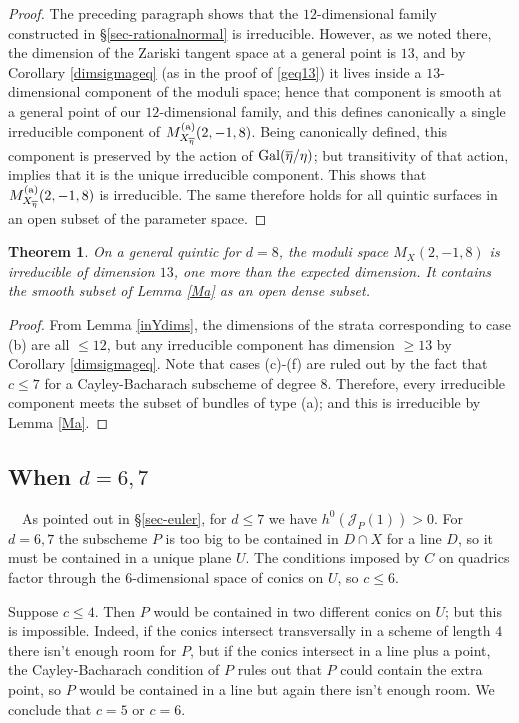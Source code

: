 \documentclass{amsart}
\theoremstyle{plain}
\newtheorem{theorem}{Theorem}[section]
\numberwithin{equation}{section}
\begin{document}
\begin{proof}
The preceding paragraph shows that the $12$-dimensional family constructed in \S \ref{sec-rationalnormal} is  irreducible. However,
as we noted there, the dimension of the Zariski tangent space at a general point 
is $13$, and by Corollary \ref{dimsigmageq} (as in the proof of \ref{geq13}) it lives inside a $13$-dimensional component of the moduli space;
hence that component is smooth at a general point of our $12$-dimensional family,
and this defines canonically a single irreducible component of  
$M^{{\rm (a)}}_{X_{\overline{\eta}}}(2,-1,8)$. Being canonically defined, this component is
preserved by the action of 
${\rm Gal} (\overline{\eta}/\eta )$; but transitivity of that action,
implies that it is the unique irreducible component. This shows that 
$M^{{\rm (a)}}_{X_{\overline{\eta}}}(2,-1,8)$ is irreducible.
The same therefore holds for 
all quintic surfaces in an open subset of the parameter space. 
\end{proof}

\begin{theorem}
\label{d8irred}
On a general quintic for $d=8$, 
the moduli space $M_X(2,-1,8)$ is irreducible of dimension $13$, one more than
the expected dimension. It contains the
smooth subset of Lemma \ref{Ma} as an open dense subset.
\end{theorem}
\begin{proof}
From Lemma \ref{inYdims}, the dimensions of the strata corresponding to case (b) 
are all $\leq 12$, but any irreducible component has dimension $\geq 13$ by Corollary \ref{dimsigmageq}.
Note that cases (c)-(f) are ruled out by the fact that $c\leq 7$ for a
Cayley-Bacharach subscheme of degree $8$. Therefore, every irreducible component meets
the subset of bundles of type (a); and this is irreducible by Lemma \ref{Ma}.
\end{proof}

\subsection{When $d=6,7$}
$\mbox{ }$
\newline
As pointed out in \S \ref{sec-euler}, for $d\leq 7$ we have $h^0({{\mathcal J}} _P(1))>0$. For 
$d=6,7$ the subscheme $P$ is too big to be contained in $D\cap X$ for a line $D$,
so it must be contained in a unique plane $U$. The conditions imposed by $C$ on 
quadrics factor through the $6$-dimensional space of conics on $U$, so $c\leq 6$.

Suppose $c\leq 4$. Then $P$ would be contained in two different conics on $U$;
but this is impossible. Indeed, if the conics intersect transversally in a 
scheme of length $4$ there isn't enough room for $P$, but
if the conics intersect in a line plus a point, the Cayley-Bacharach condition 
of $P$ rules out that $P$ could contain the extra point, so $P$ would be contained
in a line but again there isn't enough room. We conclude that $c=5$ or $c=6$.
\end{document}

